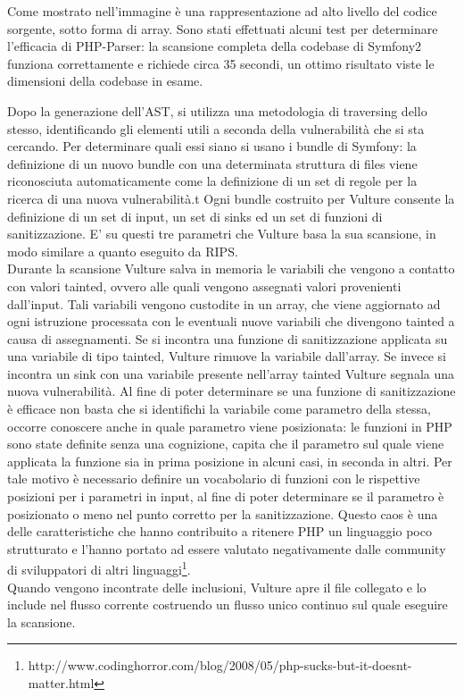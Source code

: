 \cite{Incollare codice php parser}

Come mostrato nell'immagine è una rappresentazione ad alto livello del codice sorgente, sotto forma di array. Sono stati effettuati alcuni test per determinare l'efficacia di PHP-Parser: la scansione completa della codebase di Symfony2 funziona correttamente e richiede circa 35 secondi, un ottimo risultato viste le dimensioni della codebase in esame.

Dopo la generazione dell'AST, si utilizza una metodologia di traversing dello stesso, identificando gli elementi utili a seconda della vulnerabilità che si sta cercando. Per determinare quali essi siano si usano i bundle di Symfony: la definizione di un nuovo bundle con una determinata struttura di files viene riconosciuta automaticamente come la definizione di un set di regole per la ricerca di una nuova vulnerabilità.t
Ogni bundle costruito per Vulture consente la definizione di un set di input, un set di sinks ed un set di funzioni di sanitizzazione. E' su questi tre parametri che Vulture basa la sua scansione, in modo similare a quanto eseguito da RIPS.\\
 
Durante la scansione Vulture salva in memoria le variabili che vengono a contatto con valori tainted, ovvero alle quali vengono assegnati valori provenienti dall'input. Tali variabili vengono custodite in un array, che viene aggiornato ad ogni istruzione processata con le eventuali nuove variabili che divengono tainted a causa di assegnamenti. Se si incontra una funzione di sanitizzazione applicata su una variabile di tipo tainted, Vulture rimuove la variabile dall'array. Se invece si incontra un sink con una variabile presente nell'array tainted Vulture segnala una nuova vulnerabilità. Al fine di poter determinare se una funzione di sanitizzazione è efficace non basta che si identifichi la variabile come parametro della stessa, occorre conoscere anche in quale parametro viene posizionata: le funzioni in PHP sono state definite senza una cognizione, capita che il parametro sul quale viene applicata la funzione sia in prima posizione in alcuni casi, in seconda in altri. Per tale motivo è necessario definire un vocabolario di funzioni con le rispettive posizioni per i parametri in input, al fine di poter determinare se il parametro è posizionato o meno nel punto corretto per la sanitizzazione. Questo caos è una delle caratteristiche che hanno contribuito a ritenere PHP un linguaggio poco strutturato e l'hanno portato ad essere valutato negativamente dalle community di sviluppatori di altri linguaggi\footnote{http://www.codinghorror.com/blog/2008/05/php-sucks-but-it-doesnt-matter.html}.\\
Quando vengono incontrate delle inclusioni, Vulture apre il file collegato e lo include nel flusso corrente costruendo un flusso unico continuo sul quale eseguire la scansione.


